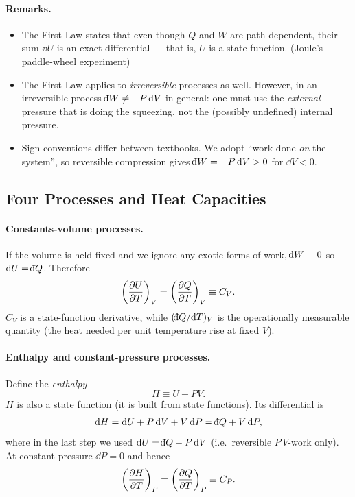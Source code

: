 \paragraph{Remarks.}
\begin{itemize}
    \item The First Law states that even though $Q$ and $W$ are path dependent, their sum $\dd U$ is an exact differential --- that is, $U$ is a state function. (Joule's paddle-wheel experiment)
    \item The First Law applies to \emph{irreversible} processes as well. However, in an irreversible process $\dbar W \neq -P\,\dd V$ in general: one must use the \emph{external} pressure that is doing the squeezing, not the (possibly undefined) internal pressure.
    \item Sign conventions differ between textbooks. We adopt ``work done \emph{on} the system'', so reversible compression gives $\dbar W = -P\,\dd V > 0$ for $\dd V < 0$. 
\end{itemize}

\subsection{Four Processes and Heat Capacities}

\paragraph{Constants-volume processes.}
If the volume is held fixed and we ignore any exotic forms of work, $\dbar W = 0$ so $\dd U = \dbar Q$. Therefore
\[
    \left(\dfrac{\partial U}{\partial T}\right)_{V} = \left(\dfrac{\partial Q}{\partial T}\right)_{V} \equiv C_V.
\]
$C_V$ is a state-function derivative, while $(\dbar Q/\dd T)_V$ is the operationally measurable quantity (the heat needed per unit temperature rise at fixed $V$).

\paragraph{Enthalpy and constant-pressure processes.}
Define the \emph{enthalpy}
\[
    H \equiv U + PV.
\]
$H$ is also a state function (it is built from state functions). Its differential is
\[
    \dd H = \dd U + P\,\dd V + V\,\dd P = \dbar Q + V\,\dd P,
\]
where in the last step we used $\dd U = \dbar Q - P\,\dd V$ (i.e.\ reversible $P\,V$-work only). At constant pressure $\dd P = 0$ and hence
\[
    \left(\dfrac{\partial H}{\partial T}\right)_{P} = \left(\dfrac{\partial Q}{\partial T}\right)_{P} \equiv C_P.
\]

